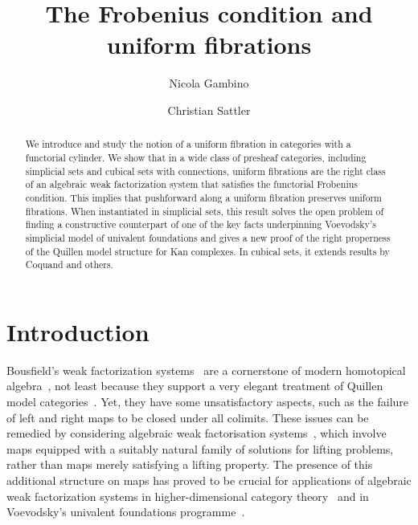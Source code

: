 \documentclass[reqno,10pt,a4paper,oneside,draft]{amsart}
\title{The Frobenius condition and uniform fibrations}
\begin{document}
\begin{abstract}
We introduce and study the notion of a uniform fibration in categories with a functorial cylinder.
We show that in a wide class of presheaf categories, including simplicial sets and cubical sets with connections, uniform fibrations are the right class of an algebraic weak factorization system that satisfies the functorial Frobenius condition.
This implies that pushforward along a uniform fibration preserves uniform fibrations.
When instantiated in simplicial sets, this result solves the open problem of finding a constructive counterpart of one of the key facts underpinning Voevodsky's simplicial model of univalent foundations and gives a new proof of the right properness of the Quillen model structure for Kan complexes.
In cubical sets, it extends results by Coquand and others.
\end{abstract}

\author{Nicola Gambino}
\address{School of Mathematics, University of Leeds, Leeds LS2 9JT, UK}

\author{Christian Sattler}
\address{School of Mathematics, University of Leeds, Leeds LS2 9JT, UK}


\maketitle

\tableofcontents

\newpage

\section*{Introduction}

Bousfield's weak factorization systems~\cite{bousfield-wfs} are a cornerstone of modern homotopical algebra~\cite{quillen-homotopical}, not least because they support a very elegant treatment of Quillen model categories~\cite{joyal-tierney-notes}.
Yet, they have some unsatisfactory aspects, such as the failure of left and right maps to be closed under all colimits.
These issues can be remedied by considering algebraic weak factorisation systems~\cite{garner:small-object-argument,grandis-tholen-nwfs}, which involve maps equipped with a suitably natural family of solutions for lifting problems, rather than maps merely satisfying a lifting property.
The presence of this additional structure on maps has proved to be crucial for applications of algebraic weak factorization systems in higher-dimensional category theory~\cite{batanin-cisinski-weber,garner:globular-operator-awfs,garner-homomorphisms} and in Voevodsky's univalent foundations programme~\cite{awodey-cubical,coquand-cubical-sets,cohen-et-al:cubicaltt,pitts-cubical-nominal,swan-awfs}.
\end{document}
